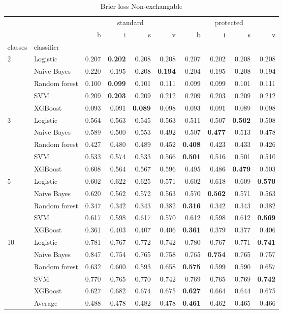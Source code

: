 \begin{table}
\caption{Brier loss Non-exchangable}
\begin{tabular}{l|l|rrrr|rrrr}
\toprule
 &  & \multicolumn{4}{c}{standard} & \multicolumn{4}{c}{protected} \\
 &  & b & i & s & v & b & i & s & v \\
classes & classifier &  &  &  &  &  &  &  &  \\
\midrule
\midrule
\multirow[c]{5}{*}{2} & Logistic & 0.207 & \textbf{0.202} & 0.208 & 0.208 & 0.207 & 0.202 & 0.208 & 0.208 \\
 & Naive Bayes & 0.220 & 0.195 & 0.208 & \textbf{0.194} & 0.204 & 0.195 & 0.208 & 0.194 \\
 & Random forest & 0.100 & \textbf{0.099} & 0.101 & 0.111 & 0.099 & 0.099 & 0.101 & 0.111 \\
 & SVM & 0.209 & \textbf{0.203} & 0.209 & 0.212 & 0.209 & 0.203 & 0.209 & 0.212 \\
 & XGBoost & 0.093 & 0.091 & \textbf{0.089} & 0.098 & 0.093 & 0.091 & 0.089 & 0.098 \\
\midrule
\multirow[c]{5}{*}{3} & Logistic & 0.564 & 0.563 & 0.545 & 0.563 & 0.511 & 0.507 & \textbf{0.502} & 0.508 \\
 & Naive Bayes & 0.589 & 0.500 & 0.553 & 0.492 & 0.507 & \textbf{0.477} & 0.513 & 0.478 \\
 & Random forest & 0.427 & 0.480 & 0.489 & 0.452 & \textbf{0.408} & 0.423 & 0.433 & 0.426 \\
 & SVM & 0.533 & 0.574 & 0.533 & 0.566 & \textbf{0.501} & 0.516 & 0.501 & 0.510 \\
 & XGBoost & 0.608 & 0.564 & 0.567 & 0.596 & 0.495 & 0.486 & \textbf{0.479} & 0.503 \\
\midrule
\multirow[c]{5}{*}{5} & Logistic & 0.602 & 0.622 & 0.625 & 0.571 & 0.602 & 0.618 & 0.609 & \textbf{0.570} \\
 & Naive Bayes & 0.620 & 0.562 & 0.572 & 0.563 & 0.570 & \textbf{0.562} & 0.571 & 0.563 \\
 & Random forest & 0.347 & 0.342 & 0.343 & 0.382 & \textbf{0.316} & 0.342 & 0.343 & 0.382 \\
 & SVM & 0.617 & 0.598 & 0.617 & 0.570 & 0.612 & 0.598 & 0.612 & \textbf{0.569} \\
 & XGBoost & 0.361 & 0.403 & 0.407 & 0.406 & \textbf{0.361} & 0.379 & 0.377 & 0.406 \\
\midrule
\multirow[c]{5}{*}{10} & Logistic & 0.781 & 0.767 & 0.772 & 0.742 & 0.780 & 0.767 & 0.771 & \textbf{0.741} \\
 & Naive Bayes & 0.847 & 0.754 & 0.765 & 0.758 & 0.765 & \textbf{0.754} & 0.765 & 0.757 \\
 & Random forest & 0.632 & 0.600 & 0.593 & 0.658 & \textbf{0.575} & 0.599 & 0.590 & 0.657 \\
 & SVM & 0.770 & 0.765 & 0.770 & 0.742 & 0.769 & 0.765 & 0.769 & \textbf{0.742} \\
 & XGBoost & 0.627 & 0.682 & 0.674 & 0.675 & \textbf{0.627} & 0.664 & 0.644 & 0.675 \\\midrule\ & Average & 0.488 & 0.478 & 0.482 & 0.478 & \textbf{0.461} & 0.462 & 0.465 & 0.466 \\
\bottomrule
\end{tabular}
\end{table}
